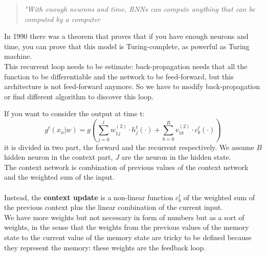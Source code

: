 
\begin{quote}
    \textit{"With enough neurons and time, RNNs can compute anything that can be computed by a computer}
\end{quote}{}

In 1990 there was a theorem that proves that if you have enough neurons and time, you can prove that this model is Turing-complete, as powerful as Turing machine.\\
This recurrent loop needs to be estimate: back-propagation needs that all the function %
to be differentiable and the network to be feed-forward, but this architecture is not feed-forward anymore. So we have to modify back-propagation or find different algorithm to discover this loop. 

If you want to consider the output at time t:
$$
g^{t}\left(x_{n} | w\right)=g\left(\sum_{j=0}^{l} w_{1 j}^{(2)} \cdot h_{j}^{t}(\cdot)+\sum_{b=0}^{B} v_{1 b}^{(2)} \cdot c_{b}^{t}(\cdot)\right)
$$
it is divided in two part, the forward and the recurrent respectively. We assume $B$ hidden neuron in the context part, $J$ are the neuron in the hidden state. \\
The context network is combination of previous values of the context network and the weighted sum of the input.\\ \\
Instead, the \textbf{context update} is a non-linear function $c_b^t$ of the weighted sum of the previous context plus the linear combination of the current input. \\
We have more weights but not necessary in form of numbers but as a sort of weights, in the sense that the weights from the previous values of the memory state to the current value of the memory state are tricky to be defined because they represent the memory: these weights are the feedback loop.\\ 

